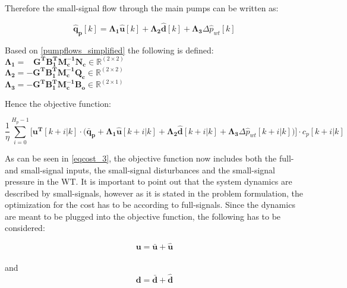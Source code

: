 Therefore the small-signal flow through the main pumps can be written as: 

 \begin{equation}
 \bm{\hat{q}_{p}}[k] =   \bm{\Lambda_1} \bm{\hat{u}}[k] + \bm{\Lambda_2} \bm{\hat{d}}[k] + \bm{\Lambda_3} \Delta \hat{p}_{wt}[k]
 \label{pumpflows_simplified}
\end{equation}

\begin{minipage}[t]{0.80\textwidth}
Based on \eqref{pumpflows_simplified} the following is defined:\\
\hspace*{8mm} $\bm{\Lambda_1} = \,\,\,\,\, \bm{G^T} \bm{B_{1}^T}\bm{M_c^{-1}}\bm{N_c} \in \pmb{\mathbb{R}}^{(2 \times 2)}$ \\
\hspace*{8mm} $\bm{\Lambda_2} = -\bm{G^T} \bm{B_{1}^T}\bm{M_c^{-1}}\bm{Q_c} \in \pmb{\mathbb{R}}^{(2 \times 2)}$ \\
\hspace*{8mm} $\bm{\Lambda_3} = -\bm{G^T} \bm{B_{1}^T}\bm{M_c^{-1}}\bm{B_{o}} \in \pmb{\mathbb{R}}^{(2 \times 1)}$ 
\end{minipage}

Hence the objective function:

\begin{equation}
 \frac{1}{\eta}\! \sum_{i=0}^{H_p-1}\! \Big[ \bm{u^T}[k+i|k] \cdot \Big(\bm{\bar{q}_p} +  \bm{\Lambda_1} \bm{\hat{u}}[k+i|k] + \bm{\Lambda_2} \bm{\hat{d}}[k+i|k] + \bm{\Lambda_3} \Delta \hat{p}_{wt}[k+i|k]\!\Big)\!\Big] \! \cdot c_p[k+i|k]
\label{eqcost_3} 
\end{equation}

As can be seen in \eqref{eqcost_3}, the objective function now includes both the full- and small-signal inputs, the small-signal disturbances and the small-signal pressure in the WT. It is important to point out that the system dynamics are described by small-signals, however as it is stated in the problem formulation, the optimization for the cost has to be according to full-signals. Since the dynamics are meant to be plugged into the objective function, the following has to be considered: 

\begin{equation}
\bm{u} = \bm{\bar{u}} + \bm{\hat{u}}
\label{u_pred}
\end{equation}\\
and\\
\begin{equation}
\bm{d} = \bm{\bar{d}} + \bm{\hat{d}}
\end{equation}

